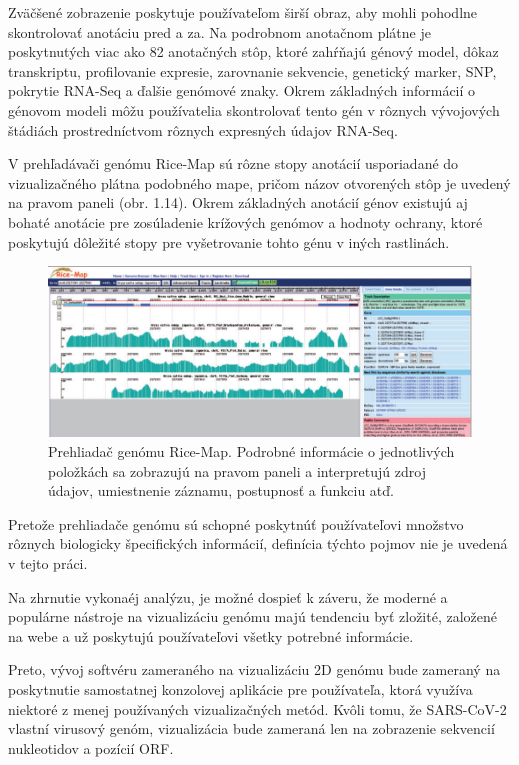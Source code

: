 Zväčšené zobrazenie poskytuje používateľom širší obraz, aby mohli pohodlne skontrolovať anotáciu pred a za.
Na podrobnom anotačnom plátne je poskytnutých viac ako 82 anotačných stôp, ktoré zahŕňajú génový model, dôkaz transkriptu, profilovanie expresie, zarovnanie sekvencie, genetický marker, SNP, pokrytie RNA-Seq a ďalšie genómové znaky.
Okrem základných informácií o génovom modeli môžu používatelia skontrolovať tento gén v rôznych vývojových štádiách prostredníctvom rôznych expresných údajov RNA-Seq.

V prehľadávači genómu Rice-Map sú rôzne stopy anotácií usporiadané do vizualizačného plátna podobného mape, pričom názov otvorených stôp je uvedený na pravom paneli (obr. 1.14).
Okrem základných anotácií génov existujú aj bohaté anotácie pre zosúladenie krížových genómov a hodnoty ochrany, ktoré poskytujú dôležité stopy pre vyšetrovanie tohto génu v iných rastlinách.

\begin{figure}[!ht]
	\centering
	\includegraphics[width=.9\textwidth]{figures/ss-2.png}
	\caption{Prehliadač genómu Rice-Map. Podrobné informácie o jednotlivých položkách sa zobrazujú na pravom paneli a interpretujú zdroj údajov, umiestnenie záznamu, postupnosť a funkciu atď.\label{o:latex_friendly_zone}}
\end{figure}

Pretože prehliadače genómu sú schopné poskytnúť používateľovi množstvo rôznych biologicky špecifických informácií, definícia týchto pojmov nie je uvedená v tejto práci.

\bigskip
\smallskip

Na zhrnutie vykonaéj analýzu, je možné dospieť k záveru, že moderné a populárne nástroje na vizualizáciu genómu majú tendenciu byť zložité, založené na webe a už poskytujú používateľovi všetky potrebné informácie.

Preto, vývoj softvéru zameraného na vizualizáciu 2D genómu bude zameraný na poskytnutie samostatnej konzolovej aplikácie pre používateľa, ktorá využíva niektoré z menej používaných vizualizačných metód.
Kvôli tomu, že SARS-CoV-2 vlastní virusový genóm, vizualizácia bude zameraná len na zobrazenie sekvencií nukleotidov a pozícií ORF.
